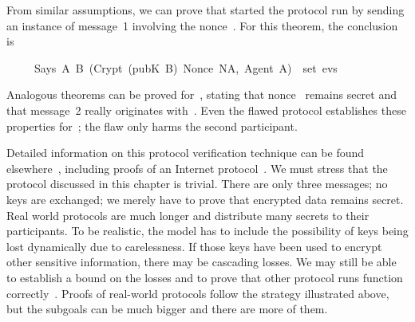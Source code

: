 From similar assumptions, we can prove that  started the protocol
run by sending an instance of message~1 involving the nonce~\@. 
For this theorem, the conclusion is 
\begin{isabelle}
\ \ \ \ \ Says\ A\ B\ (Crypt\ (pubK\ B)\ \isasymlbrace Nonce\ NA,\ Agent\
A\isasymrbrace )\ \isasymin \ set\ evs
\end{isabelle}
%
Analogous theorems can be proved for~, stating that nonce~
remains secret and that message~2 really originates with~\isa{B}.  Even the
flawed protocol establishes these properties for~\isa{A};
the flaw only harms the second participant.

\medskip

Detailed information on this protocol verification technique can be found
elsewhere~\cite{paulson-jcs}, including proofs of an Internet
protocol~\cite{paulson-tls}.  We must stress that the protocol discussed
in this chapter is trivial.  There are only three messages; no keys are
exchanged; we merely have to prove that encrypted data remains secret. 
Real world protocols are much longer and distribute many secrets to their
participants.  To be realistic, the model has to include the possibility
of keys being lost dynamically due to carelessness.  If those keys have
been used to encrypt other sensitive information, there may be cascading
losses.  We may still be able to establish a bound on the losses and to
prove that other protocol runs function
correctly~\cite{paulson-yahalom}.  Proofs of real-world protocols follow
the strategy illustrated above, but the subgoals can
be much bigger and there are more of them.


\endinput

